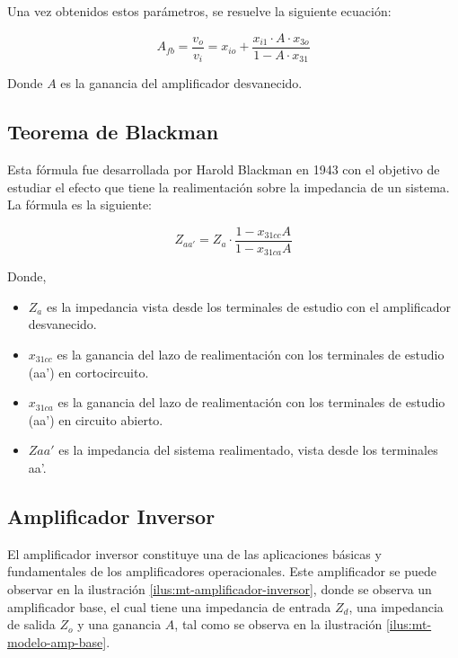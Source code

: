 Una vez obtenidos estos parámetros, se resuelve la siguiente ecuación:

\begin{equation}
    \boxed{A_{fb} = \frac{v_o}{v_i} = x_{io} + \frac{x_{i1} \cdot A \cdot x_{3o}}{1 - A \cdot x_{31}}}
    \label{eq:mt-MAD}
\end{equation}

Donde $A$ es la ganancia del amplificador desvanecido.

\subsection{Teorema de Blackman}

Esta fórmula fue desarrollada por Harold Blackman en 1943 con el objetivo de estudiar el efecto que tiene la realimentación sobre la impedancia de
un sistema. La fórmula es la siguiente:

\begin{equation}
    \boxed{Z_{aa'} = Z_a \cdot \frac{1 - x_{31cc}A}{1 - x_{31ca}A}}
    \label{eq:mt-Blackman}
\end{equation}

Donde,

\begin{itemize}
    \item $Z_a$ es la impedancia vista desde los terminales de estudio con el amplificador desvanecido.
    \item $x_{31cc}$ es la ganancia del lazo de realimentación con los terminales de estudio (aa') en cortocircuito.
    \item $x_{31ca}$ es la ganancia del lazo de realimentación con los terminales de
estudio (aa') en circuito abierto.
\item $Z{aa'}$ es la impedancia del sistema realimentado, vista desde los terminales aa'.
\end{itemize}

\subsection{Amplificador Inversor}

El amplificador inversor constituye una de las aplicaciones básicas y fundamentales de los amplificadores operacionales. Este amplificador se puede observar en la ilustración \ref{ilus:mt-amplificador-inversor}, donde se observa un amplificador base, el cual tiene
una impedancia de entrada $Z_d$, una impedancia de salida $Z_o$ y una ganancia $A$, tal como se observa en la ilustración \ref{ilus:mt-modelo-amp-base}.

